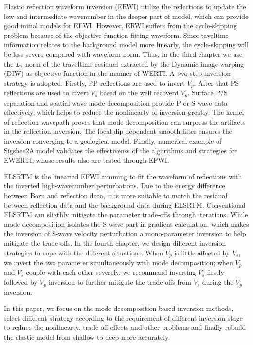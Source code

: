 \begin{eabstract}
Elastic reflection waveform inversion (ERWI) utilize the reflections to update the low and
intermediate wavenumber in the
deeper part of model, which can provide good initial models for EFWI. However, ERWI suffers from
the cycle-skipping problem because of the objective function fitting waveform. Since taveltime
information relates to the background model more linearly, the cycle-skipping will be less severe
compared with waveform norm. Thus, in the third chapter we use the $L_2$ norm of the traveltime
residual extracted by the Dynamic image warping (DIW) as objective function in the manner of
WERTI. 
A two-step inversion strategy is adopted. Firstly, PP reflections are used to invert $V_p$. 
After that PS reflections are used to invert $V_s$ based on the well recoverd $V_p$. Surface P/S
separation and spatial wave mode decomposition provide P or S wave data effectively, which helps
to  reduce the nonlinearty of inversion greatly.
The kernel of reflection wavepath proves that mode decomposition can surpress the artifacts in
the reflection inversion. The local dip-dependent smooth filter ensures the inversion converging to
a
geological model. Finally, numerical example of Sigsbee2A model validates the effectivenss of the 
algorithms and strategies for EWERTI, whose results also are tested through EFWI.

ELSRTM is the linearied EFWI aimming to fit the waveform of reflections with the inverted
high-wavenumber perturbations. Due to the energy difference between Born and reflection data, it is
more suitable to match the residual between reflection data and the background data during ELSRTM.
Conventional
ELSRTM can sligthly mitigate the parameter trade-offs through iterations. While mode decomposition
isolates the S-wave part in  gradient calculation, which makes the inversion of S-wave velocity
perturbation a mono-parameter inversion to help mitigate the trade-offs. In the fourth chapter, we
design different inversion strategies to cope with the different situations. When $V_p$ is little
affected by $V_s$, we invert the two parameter simultaneously with mode decomposition; when $V_p$
and $V_s$ couple with each
other severely, we recommand inverting $V_s$ firstly followed by $V_p$ inversion to further mitigate
the trade-offs from $V_s$ during the $V_p$ inversion.

In this paper, we focus on the mode-decomposition-based inversion methods, select different strategy
according to the requirement of different inversion stage to reduce the nonlinearty, trade-off
effects and other problems and finally rebuild the elastic model from shallow to
deep more accurately. 

\end{eabstract}

